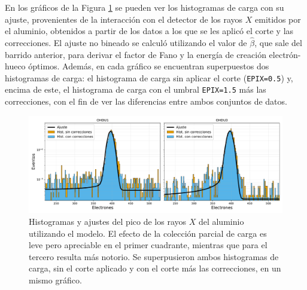 En los gráficos de la Figura \ref{fig:Al_OHDU1y3_EPIX15_Corr} se pueden ver los histogramas de carga con su ajuste, provenientes de la interacción con el detector de los rayos $X$ emitidos por el aluminio, obtenidos a partir de los datos a los que se les aplicó el corte y las correcciones. El ajuste no bineado se calculó utilizando el valor de $\hat{\beta}$, que sale del barrido anterior, para derivar el factor de Fano y la energía de creación electrón-hueco óptimos. Además, en cada gráfico se encuentran superpuestos dos histogramas de carga: el histograma de carga sin aplicar el corte (\verb|EPIX=0.5|) y, encima de este, el histograma de carga con el umbral \verb|EPIX=1.5| más las correcciones, con el fin de ver las diferencias entre ambos conjuntos de datos.
\begin{figure}[h]
    \centering
        \includegraphics[scale=0.5]{Figs/Al_hists_ohdu1y3_dobles.pdf}
    \caption{Histogramas y ajustes del pico de los rayos $X$ del aluminio utilizando el modelo. El efecto de la colección parcial de carga es leve pero apreciable en el primer cuadrante, mientras que para el tercero resulta más notorio. Se superpusieron ambos histogramas de carga, sin el corte aplicado y con el corte más las correcciones, en un mismo gráfico.}
    \label{fig:Al_OHDU1y3_EPIX15_Corr}
\end{figure}

